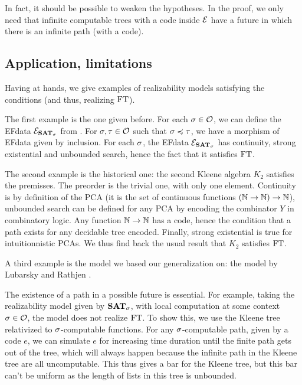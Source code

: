 \documentclass[a4paper,UKenglish,cleveref, autoref, thm-restate]{lipics-v2021}
\begin{document}
\begin{remark}
  In fact, it should be possible to weaken the hypotheses. In the proof, we only need that infinite computable trees with a code inside $\mathcal{E}$ have a future in which there is an infinite path (with a code).
\end{remark}


\subsection{Application, limitations}
\label{s:application}
Having  at hands, we give examples of realizability models satisfying the conditions (and thus, realizing $\mathrm{FT}$).

The first example is the one given before. For each $\sigma \in \mathcal O$, we can define the EFdata $\mathcal{E}_{{\mathbf{SAT}}_{\sigma}}$ from . For $\sigma, \tau \in \mathcal O$ such that $\sigma\preccurlyeq \tau$, we have a morphism of EFdata given by inclusion. For each $\sigma$, the EFdata $\mathcal{E}_{{\mathbf{SAT}}_{\sigma}}$ has continuity, strong existential and unbounded search, hence the fact that it satisfies $\mathrm{FT}$.

The second example is the historical one: the second Kleene algebra $K_2$ \cite{Kleene1965} satisfies the premisses. The preorder is the trivial one, with only one element. Continuity is by definition of the PCA (it is the set of continuous functions $(\mathbb N \to \mathbb N) \to \mathbb N$), unbounded search can be defined for any PCA by encoding the combinator $Y$ in combinatory logic. Any function $\mathbb N \to \mathbb N$ has a code, hence the condition that a path exists for any decidable tree encoded. Finally, strong existential is true for intuitionnistic PCAs. We thus find back the usual result that $K_2$ satisfies $\mathrm{FT}$.

A third example is the model we based our generalization on: the model by Lubarsky and Rathjen \cite{LubRat13}.

The existence of a path in a possible future is essential. For example, taking the realizability model given by ${\mathbf{SAT}}_{\sigma}$, with local computation at some context $\sigma\in\mathcal O$, the model does not realize $\mathrm{FT}$. To show this, we use the Kleene tree relativized to $\sigma$-computable functions. For any $\sigma$-computable path, given by a code $e$, we can simulate $e$ for increasing time duration until the finite path gets out of the tree, which will always happen because the infinite path in the Kleene tree are all uncomputable. This thus gives a bar for the Kleene tree, but this bar can't be uniform as the length of lists in this tree is unbounded.
\end{document}

